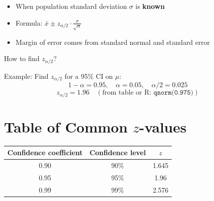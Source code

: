 \begin{itemize}
  \item When population standard deviation $\sigma$ is \textbf{known}
  \item Formula: $\bar{x} \pm z_{\alpha/2} \cdot \frac{\sigma}{\sqrt{n}}$
  \item Margin of error comes from standard normal and standard error
\end{itemize}

How to find $z_{\alpha/2}$?

Example: Find $z_{\alpha/2}$ for a 95\% CI on $\mu$:
\[
1 - \alpha = 0.95, \quad \alpha = 0.05, \quad \alpha/2 = 0.025
\]
\[
z_{\alpha/2} = 1.96 \quad (\text{from table or R: } \texttt{qnorm(0.975)})
\]


\section*{Table of Common $z$-values}

\begin{center}
\begin{tabular}{|c|c|c|}
\hline
Confidence coefficient & Confidence level & $z$ \\
\hline
0.90 & 90\% & 1.645 \\
0.95 & 95\% & 1.96 \\
0.99 & 99\% & 2.576 \\
\hline
\end{tabular}
\end{center}




